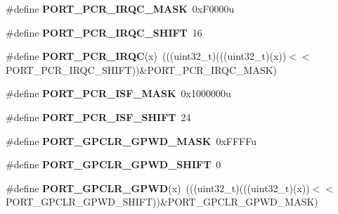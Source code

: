\begin{DoxyCompactItemize}
\item 
\#define {\bfseries P\+O\+R\+T\+\_\+\+P\+C\+R\+\_\+\+I\+R\+Q\+C\+\_\+\+M\+A\+SK}~0x\+F0000u\hypertarget{group__PORT__Register__Masks_gabaef70d886fda0a7da8e862308bf5909}{}\label{group__PORT__Register__Masks_gabaef70d886fda0a7da8e862308bf5909}

\item 
\#define {\bfseries P\+O\+R\+T\+\_\+\+P\+C\+R\+\_\+\+I\+R\+Q\+C\+\_\+\+S\+H\+I\+FT}~16\hypertarget{group__PORT__Register__Masks_ga0bda43cd85ca4d5df17f12a193937d81}{}\label{group__PORT__Register__Masks_ga0bda43cd85ca4d5df17f12a193937d81}

\item 
\#define {\bfseries P\+O\+R\+T\+\_\+\+P\+C\+R\+\_\+\+I\+R\+QC}(x)~(((uint32\+\_\+t)(((uint32\+\_\+t)(x))$<$$<$P\+O\+R\+T\+\_\+\+P\+C\+R\+\_\+\+I\+R\+Q\+C\+\_\+\+S\+H\+I\+FT))\&P\+O\+R\+T\+\_\+\+P\+C\+R\+\_\+\+I\+R\+Q\+C\+\_\+\+M\+A\+SK)\hypertarget{group__PORT__Register__Masks_ga7e6b6f68db9e76cf6fa34774c9b9b8f9}{}\label{group__PORT__Register__Masks_ga7e6b6f68db9e76cf6fa34774c9b9b8f9}

\item 
\#define {\bfseries P\+O\+R\+T\+\_\+\+P\+C\+R\+\_\+\+I\+S\+F\+\_\+\+M\+A\+SK}~0x1000000u\hypertarget{group__PORT__Register__Masks_ga154d9308c2ab5b6a78ab04d9f3b08879}{}\label{group__PORT__Register__Masks_ga154d9308c2ab5b6a78ab04d9f3b08879}

\item 
\#define {\bfseries P\+O\+R\+T\+\_\+\+P\+C\+R\+\_\+\+I\+S\+F\+\_\+\+S\+H\+I\+FT}~24\hypertarget{group__PORT__Register__Masks_ga5fbf95753704fb1d71da88299c11105e}{}\label{group__PORT__Register__Masks_ga5fbf95753704fb1d71da88299c11105e}

\item 
\#define {\bfseries P\+O\+R\+T\+\_\+\+G\+P\+C\+L\+R\+\_\+\+G\+P\+W\+D\+\_\+\+M\+A\+SK}~0x\+F\+F\+F\+Fu\hypertarget{group__PORT__Register__Masks_gaa7e4a890e9d09d85279889ce3ecb0044}{}\label{group__PORT__Register__Masks_gaa7e4a890e9d09d85279889ce3ecb0044}

\item 
\#define {\bfseries P\+O\+R\+T\+\_\+\+G\+P\+C\+L\+R\+\_\+\+G\+P\+W\+D\+\_\+\+S\+H\+I\+FT}~0\hypertarget{group__PORT__Register__Masks_gaafacaac0aa215f596b947609857d6491}{}\label{group__PORT__Register__Masks_gaafacaac0aa215f596b947609857d6491}

\item 
\#define {\bfseries P\+O\+R\+T\+\_\+\+G\+P\+C\+L\+R\+\_\+\+G\+P\+WD}(x)~(((uint32\+\_\+t)(((uint32\+\_\+t)(x))$<$$<$P\+O\+R\+T\+\_\+\+G\+P\+C\+L\+R\+\_\+\+G\+P\+W\+D\+\_\+\+S\+H\+I\+FT))\&P\+O\+R\+T\+\_\+\+G\+P\+C\+L\+R\+\_\+\+G\+P\+W\+D\+\_\+\+M\+A\+SK)\hypertarget{group__PORT__Register__Masks_gae13a63b19950557e19c9a884f3d3b77a}{}\label{group__PORT__Register__Masks_gae13a63b19950557e19c9a884f3d3b77a}


\end{DoxyCompactItemize}
